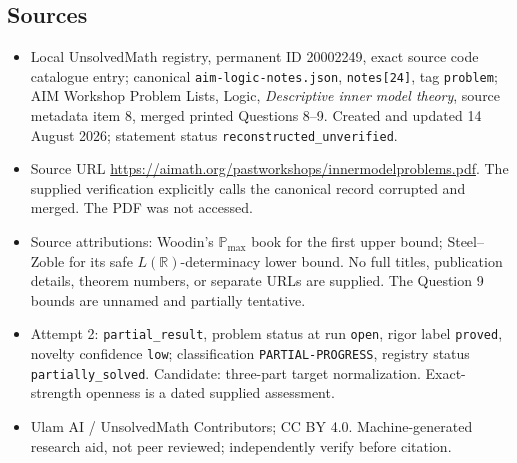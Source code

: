 \documentclass[11pt]{article}
\newcommand{\R}{\mathbb{R}}
\begin{document}
\subsection{Sources}
\begin{itemize}
\item Local UnsolvedMath registry, permanent ID 20002249, exact source code catalogue entry; canonical \texttt{aim-logic-notes.json}, \texttt{notes[24]}, tag \texttt{problem}; AIM Workshop Problem Lists, Logic, \emph{Descriptive inner model theory}, source metadata item 8, merged printed Questions 8--9. Created and updated 14 August 2026; statement status \texttt{reconstructed\_unverified}.
\item Source URL \url{https://aimath.org/pastworkshops/innermodelproblems.pdf}. The supplied verification explicitly calls the canonical record corrupted and merged. The PDF was not accessed.
\item Source attributions: Woodin's \(\mathbb P_{\max}\) book for the first upper bound; Steel--Zoble for its safe \(L(\R)\)-determinacy lower bound. No full titles, publication details, theorem numbers, or separate URLs are supplied. The Question 9 bounds are unnamed and partially tentative.
\item Attempt 2: \texttt{partial\_result}, problem status at run \texttt{open}, rigor label \texttt{proved}, novelty confidence \texttt{low}; classification \texttt{PARTIAL-PROGRESS}, registry status \texttt{partially\_solved}. Candidate: three-part target normalization. Exact-strength openness is a dated supplied assessment.
\item Ulam AI / UnsolvedMath Contributors; CC BY 4.0. Machine-generated research aid, not peer reviewed; independently verify before citation.
\end{itemize}
\end{document}
